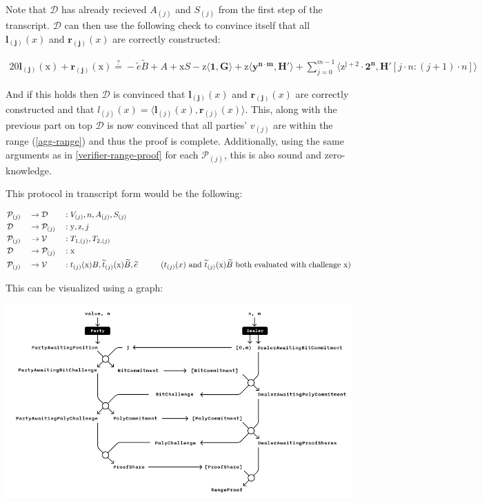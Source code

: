 \documentclass{article}
\newcommand{\eq}[1]{\begin{alignat*}{20}#1\end{alignat*}}
\renewcommand{\vec}[1]{\boldsymbol{#1}}
\newcommand{\ran}[1]{\mathrm{#1}}
\newcommand{\vecran}[1]{\mathbf{#1}}
\newcommand{\V}{\mathcal{V}}
\renewcommand{\P}{\mathcal{P}}
\newcommand{\D}{\mathcal{D}}
\newcommand{\dotp}[2]{\langle #1, #2 \rangle}
\newcommand{\tB}{\widetilde{B}}
\renewcommand{\tt}{\widetilde{t}}
\begin{document}
Note that $\D$ has already recieved $A_{(j)}$ and $S_{(j)}$ from the
first step of the transcript. $\D$ can then use the following check
to convince itself that all $\vec{l_{(j)}}(x)$ and $\vec{r_{(j)}}(x)$
are correctly constructed:

\eq{
	\vec{l_{(j)}}(\ran{x}) + \vec{r_{(j)}}(\ran{x}) \stackrel{?}{=} -\widetilde{e}\widetilde{B} + A + \ran{x}S - \ran{z}\dotp{\vec{1}}{\vec{G}} + \ran{z}\dotp{\vecran{y^{n \cdot m}}}{\vec{H'}} + \sum^{m-1}_{j = 0}\dotp{\ran{z^{j+2}} \cdot \vec{2^n}}{\vec{H'}[j \cdot n: (j+1) \cdot n]}
}

And if this holds then $\D$ is convinced that $\vec{l_{(j)}}(x)$ and
$\vec{r_{(j)}}(x)$ are correctly constructed and that $l_{(j)}(x)
= \dotp{\vec{l}_{(j)}(x)}{\vec{r}_{(j)}(x)}$. This, along with
the previous part on top $\D$ is now convinced that all parties'
$v_{(j)}$ are within the range (\ref{agg-range}) and thus the
proof is complete. Additionally, using the same arguments as in
\ref{verifier-range-proof} for each $\P_{(j)}$, this is also sound
and zero-knowledge.

This protocol in transcript form would be the following: 

\eq{
	&\P_{(j)} &&\rightarrow \D &&: V_{(j)}, n, A_{(j)}, S_{(j)} \\
	&\D &&\rightarrow \P_{(j)} &&: \ran{y}, \ran{z}, j \\
	&\P_{(j)} &&\rightarrow \V &&: T_{1, (j)}, T_{2,(j)} \\
	&\D &&\rightarrow \P_{(j)} &&: \ran{x} \\
	&\P_{(j)} &&\rightarrow \V &&: t_{(j)}(\ran{x})B, \tt_{(j)}(\ran{x})\tB, \widetilde{e} \hspace*{1cm}\text{($t_{(j)}(x)$ and $\tt_{(j)}(\ran{x})\tB$ both evaluated with challenge $\ran{x}$)}\\
}

This can be visualized using a graph:

\includegraphics[scale=0.505]{img/multi-party protocol.png}
\end{document}
